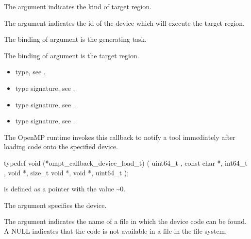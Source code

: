 \argdesc

The argument  indicates the kind of target region.

\epdesc

The argument  indicates the id of the device
which will execute the target region.

The binding of argument  is the generating task.

The binding of argument  is the target region.

\codeptrdesc

\crossreferences
\begin{itemize}
\item {} type, see
.
\item {} type signature, see
.
\item {} type signature, see
.
\item {} type signature, see
.
\end{itemize}

\label{sec:ompt_callback_device_load_t}

\summary
The OpenMP runtime invokes this callback to notify a tool immediately after loading code onto the specified device.

\format


\begin{ccppspecific}
\begin{omptCallback}
typedef void (*ompt_callback_device_load_t) (
  uint64_t ,
  const char *,
  int64_t ,
  void *,
  size_t 
  void *,
  void *,
  uint64_t 
);
\end{omptCallback}

\end{ccppspecific}
 is defined as a pointer with the value \textasciitilde 0.


\argdesc
The argument  specifies the device.

The argument  indicates the name of a file in which the device code can be found. A NULL  indicates that the code is not available in a file in the file system.

